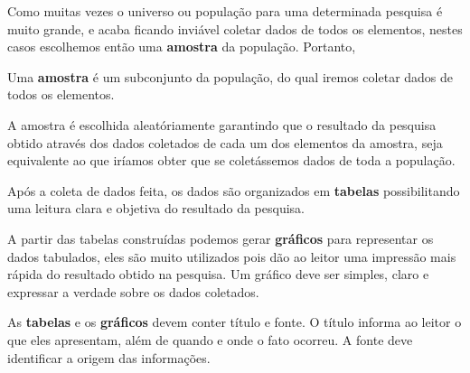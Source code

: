  Como muitas vezes o universo ou população para uma determinada pesquisa é muito grande, e acaba ficando inviável coletar dados de todos os elementos, nestes casos escolhemos então uma \textbf{amostra} da população. Portanto,
 
  \vskip0.3cm
 \colorbox{azul}{
 \begin{minipage}{13cm}
 \begin{center}
  Uma \textbf{amostra} é um subconjunto da população, do qual iremos coletar dados de todos os elementos. 
 \end{center}
 \end{minipage}}
 \vskip0.3cm

 A amostra é escolhida aleatóriamente garantindo que o resultado da pesquisa obtido através dos dados coletados de cada um dos elementos da amostra, seja equivalente ao que iríamos obter que se coletássemos dados de toda a população.
 
 Após a coleta de dados feita, os dados são organizados em \textbf{tabelas} possibilitando uma leitura clara e objetiva do resultado da pesquisa.
 
 A partir das tabelas construídas podemos gerar \textbf{gráficos} para representar os dados tabulados, eles são muito utilizados pois dão ao leitor uma impressão mais rápida do resultado obtido na pesquisa. Um gráfico deve ser simples, claro e expressar a verdade sobre os dados coletados.
 
  
   \vskip0.3cm
 \colorbox{amarelo}{
 \begin{minipage}{13cm}
 \begin{center}
  As \textbf{tabelas} e os \textbf{gráficos} devem conter título e fonte. O título informa ao leitor o que eles apresentam, além de quando e onde o fato ocorreu. A fonte deve identificar a origem das informações.  
 \end{center}
 \end{minipage}}
 \vskip0.3cm

